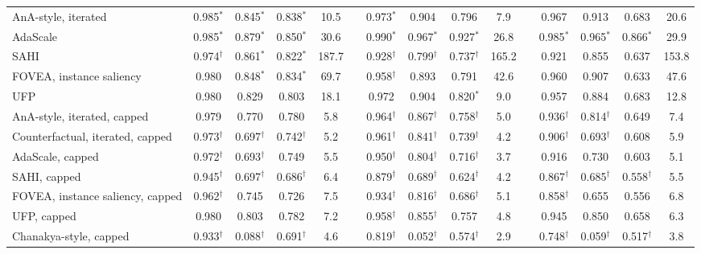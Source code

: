 \documentclass[10pt,letterpaper]{article}
\theoremstyle{remark}
\theoremstyle{plain}
\theoremstyle{definition}
\begin{document}
\begin{table}[!htbp]
\begin{tabular}{@{}lcccccccccccccc@{}}
\midrule
AnA-style, iterated & 0.985$^{*}$ & 0.845$^{*}$ & 0.838$^{*}$ & 10.5 &  & 0.973$^{*}$ & 0.904 & 0.796 & 7.9 &  & 0.967 & 0.913 & 0.683 & 20.6 \\
AdaScale & 0.985$^{*}$ & 0.879$^{*}$ & 0.850$^{*}$ & 30.6 &  & 0.990$^{*}$ & 0.967$^{*}$ & 0.927$^{*}$ & 26.8 &  & 0.985$^{*}$ & 0.965$^{*}$ & 0.866$^{*}$ & 29.9 \\
SAHI & 0.974$^{\dagger}$ & 0.861$^{*}$ & 0.822$^{*}$ & 187.7 &  & 0.928$^{\dagger}$ & 0.799$^{\dagger}$ & 0.737$^{\dagger}$ & 165.2 &  & 0.921 & 0.855 & 0.637 & 153.8 \\
FOVEA, instance saliency & 0.980 & 0.848$^{*}$ & 0.834$^{*}$ & 69.7 &  & 0.958$^{\dagger}$ & 0.893 & 0.791 & 42.6 &  & 0.960 & 0.907 & 0.633 & 47.6 \\
UFP & 0.980 & 0.829 & 0.803 & 18.1 &  & 0.972 & 0.904 & 0.820$^{*}$ & 9.0 &  & 0.957 & 0.884 & 0.683 & 12.8 \\
\midrule
AnA-style, iterated, capped & 0.979 & 0.770 & 0.780 & 5.8 &  & 0.964$^{\dagger}$ & 0.867$^{\dagger}$ & 0.758$^{\dagger}$ & 5.0 &  & 0.936$^{\dagger}$ & 0.814$^{\dagger}$ & 0.649 & 7.4 \\
Counterfactual, iterated, capped & 0.973$^{\dagger}$ & 0.697$^{\dagger}$ & 0.742$^{\dagger}$ & 5.2 &  & 0.961$^{\dagger}$ & 0.841$^{\dagger}$ & 0.739$^{\dagger}$ & 4.2 &  & 0.906$^{\dagger}$ & 0.693$^{\dagger}$ & 0.608 & 5.9 \\
AdaScale, capped & 0.972$^{\dagger}$ & 0.693$^{\dagger}$ & 0.749 & 5.5 &  & 0.950$^{\dagger}$ & 0.804$^{\dagger}$ & 0.716$^{\dagger}$ & 3.7 &  & 0.916 & 0.730 & 0.603 & 5.1 \\
SAHI, capped & 0.945$^{\dagger}$ & 0.697$^{\dagger}$ & 0.686$^{\dagger}$ & 6.4 &  & 0.879$^{\dagger}$ & 0.689$^{\dagger}$ & 0.624$^{\dagger}$ & 4.2 &  & 0.867$^{\dagger}$ & 0.685$^{\dagger}$ & 0.558$^{\dagger}$ & 5.5 \\
FOVEA, instance saliency, capped & 0.962$^{\dagger}$ & 0.745 & 0.726 & 7.5 &  & 0.934$^{\dagger}$ & 0.816$^{\dagger}$ & 0.686$^{\dagger}$ & 5.1 &  & 0.858$^{\dagger}$ & 0.655 & 0.556 & 6.8 \\
UFP, capped & 0.980 & 0.803 & 0.782 & 7.2 &  & 0.958$^{\dagger}$ & 0.855$^{\dagger}$ & 0.757 & 4.8 &  & 0.945 & 0.850 & 0.658 & 6.3 \\
Chanakya-style, capped & 0.933$^{\dagger}$ & 0.088$^{\dagger}$ & 0.691$^{\dagger}$ & 4.6 &  & 0.819$^{\dagger}$ & 0.052$^{\dagger}$ & 0.574$^{\dagger}$ & 2.9 &  & 0.748$^{\dagger}$ & 0.059$^{\dagger}$ & 0.517$^{\dagger}$ & 3.8 \\

\end{tabular}
\end{table}
\end{document}
